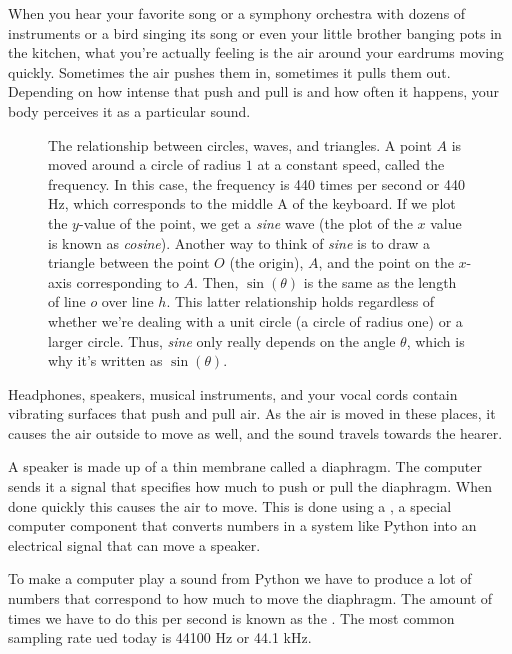 When you hear your favorite song or a symphony orchestra with dozens of instruments or a bird
singing its song or even your little brother banging pots in the kitchen, what you're actually
feeling is the air around your eardrums moving quickly. Sometimes the air pushes them in, sometimes
it pulls them out. Depending on how intense that push and pull is and how often it happens, your
body perceives it as a particular sound.

\begin{figure}[t]
  \fixfigure
  \caption{The relationship between circles, waves, and triangles. A point $A$ is moved around a
    circle of radius $1$ at a constant speed, called the frequency. In this case, the frequency is
    440 times per second or 440 Hz, which corresponds to the middle A of the keyboard. If we plot
    the $y$-value of the point, we get a \emph{sine} wave (the plot of the $x$ value is known as
    \emph{cosine}). Another way to think of \emph{sine} is to draw a triangle between the point
    $O$ (the origin), $A$, and the point on the $x$-axis corresponding to $A$. Then, $\sin(\theta)$ is the same
    as the length of line $o$ over line $h$. This latter relationship holds regardless of whether
    we're dealing with a unit circle (a circle of radius one) or a larger circle. Thus, \emph{sine}
    only really depends on the angle $\theta$, which is why it's written as $\sin(\theta)$.}
  \label{fig:middle-a}
  \centering
  
\end{figure}

Headphones, speakers, musical instruments, and your vocal cords contain vibrating surfaces that push
and pull air. As the air is moved in these places, it causes the air outside to move as well, and
the sound travels towards the hearer.

A speaker is made up of a thin membrane called a diaphragm. The computer sends it a signal that
specifies how much to push or pull the diaphragm. When done quickly this causes the air to
move. This is done using a , a special computer component that converts numbers in
a system like Python into an electrical signal that can move a speaker.

To make a computer play a sound from Python we have to produce a lot of numbers that correspond to
how much to move the diaphragm. The amount of times we have to do this per second is known as
the . The most common sampling rate ued today is 44100 Hz or 44.1 kHz.


